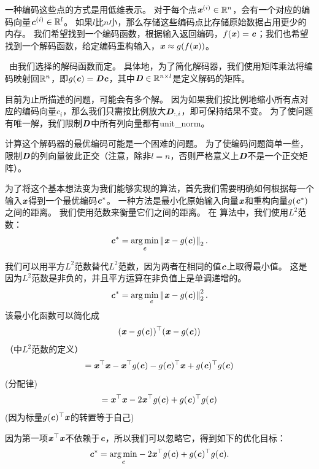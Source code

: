 一种编码这些点的方式是用低维表示。
对于每个点$\Vx^{(i)} \in \SetR^n$，会有一个对应的编码向量$\Vc^{(i)}\in \SetR^l$。
如果$l$比$n$小，那么存储这些编码点比存储原始数据占用更少的内存。
我们希望找到一个编码函数，根据输入返回编码，$f(\Vx)=\Vc$；我们也希望找到一个解码函数，给定编码重构输入，$\Vx\approx g(f(\Vx))$。


~由我们选择的解码函数而定。
具体地，为了简化解码器，我们使用矩阵乘法将编码映射回$\SetR^n$，即$g(\Vc)=\MD\Vc$，其中$\MD\in \SetR^{n\times l}$是定义解码的矩阵。


目前为止所描述的问题，可能会有多个解。
因为如果我们按比例地缩小所有点对应的编码向量$c_i$，那么我们只需按比例放大$\MD_{:,i}$，即可保持结果不变。
为了使问题有唯一解，我们限制$\MD$中所有列向量都有\gls{unit_norm}。


计算这个解码器的最优编码可能是一个困难的问题。
为了使编码问题简单一些，\,限制$\MD$的列向量彼此正交（注意，除非$l=n$，否则严格意义上$\MD$不是一个正交矩阵）。


为了将这个基本想法变为我们能够实现的算法，首先我们需要明确如何根据每一个输入$\Vx$得到一个最优编码$\Vc^*$。
一种方法是最小化原始输入向量$\Vx$和重构向量$g(\Vc^*)$之间的距离。
我们使用范数来衡量它们之间的距离。
在\,\,算法中，我们使用$L^2$范数：
\begin{equation}
 \Vc^* = \underset{\Vc}{\arg\min} \norm{\Vx-g(\Vc)}_2.
\end{equation}


我们可以用平方$L^2$范数替代$L^2$范数，因为两者在相同的值$\Vc$上取得最小值。
这是因为$L^2$范数是非负的，并且平方运算在非负值上是单调递增的。
\begin{equation}
\Vc^* = \argmin_{\Vc} \norm{\Vx - g(\Vc)}_2^2.
\end{equation}
该最小化函数可以简化成
\begin{equation}
(\Vx-g(\Vc))^\top(\Vx-g(\Vc))
\end{equation}
（中$L^2$范数的定义）
\begin{equation}
    = \Vx^\top\Vx - \Vx^\top g(\Vc) - g(\Vc)^\top\Vx + g(\Vc)^\top g(\Vc)
\end{equation}
(分配律)
\begin{equation}
    = \Vx^\top \Vx - 2\Vx^\top g(\Vc) + g(\Vc)^\top g(\Vc)
\end{equation}
(因为标量$g(\Vc)^\top\Vx$的转置等于自己)


因为第一项$\Vx^\top\Vx$不依赖于$\Vc$，所以我们可以忽略它，得到如下的优化目标：
\begin{equation}
\Vc^* = \underset{\Vc}{\arg\min} - 2\Vx^\top g(\Vc) + g(\Vc)^\top g(\Vc).
\end{equation}

